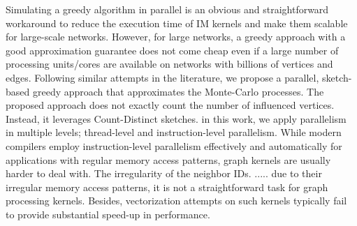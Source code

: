 \documentclass[10pt,journal,compsoc]{IEEEtran}
\begin{document}
 

Simulating a greedy algorithm in parallel is an obvious and straightforward workaround to reduce the execution time of IM kernels and make them scalable for large-scale networks. However, for large networks, a greedy approach with a good approximation guarantee does not come cheap even if a large number of processing units/cores are available on networks with billions of vertices and edges. Following similar attempts in the literature, we propose a parallel, sketch-based greedy approach that approximates the Monte-Carlo processes. The proposed approach does not exactly count the number of influenced vertices. Instead, it leverages Count-Distinct sketches. 
in this work, we apply parallelism in multiple levels; thread-level and instruction-level parallelism. While modern compilers employ instruction-level parallelism effectively and automatically for applications with regular memory access patterns, graph kernels are usually harder to deal with. The irregularity of the neighbor IDs. ..... due to their irregular memory access patterns, it is not a straightforward task for graph processing kernels.  Besides, vectorization attempts on such kernels typically fail to provide substantial speed-up in performance. 
\end{document}
